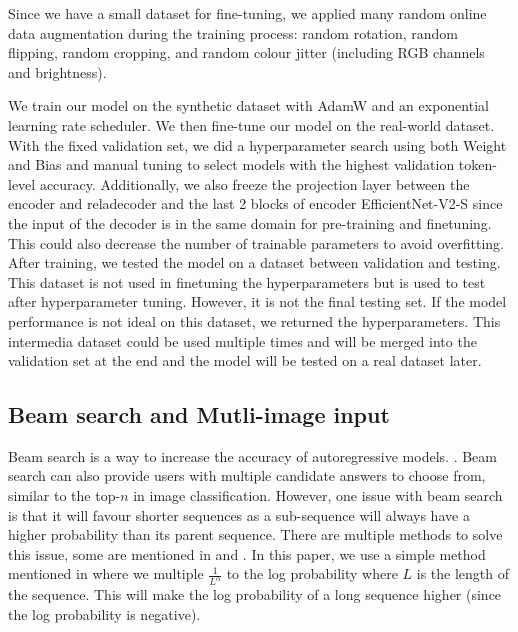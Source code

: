 \documentclass{article}
\begin{document}
Since we have a small dataset for fine-tuning, we applied many random online data augmentation during the training process: random rotation, random flipping, random cropping,  and random colour jitter (including RGB channels and brightness). 

We train our model on the synthetic dataset with AdamW \autocite{adamw} and an exponential learning rate scheduler. We then fine-tune our model on the real-world dataset. With the fixed validation set, we did a hyperparameter search using both Weight and Bias \autocite{wandb} and manual tuning to select models with the highest validation token-level accuracy.  
Additionally, we also freeze the projection layer between the encoder and reladecoder and the last 2 blocks of encoder EfficientNet-V2-S since the input of the decoder is in the same domain for pre-training and finetuning. This could also decrease the number of trainable parameters to avoid overfitting. 
After training, we tested the model on a dataset between validation and testing. This dataset is not used in finetuning the hyperparameters but is used to test after hyperparameter tuning. However, it is not the final testing set. If the model performance is not ideal on this dataset, we returned the hyperparameters. This intermedia dataset could be used multiple times and will be merged into the validation set at the end and the model will be tested on a real dataset later.

\subsection{Beam search and Mutli-image input}
Beam search is a way to increase the accuracy of autoregressive models. \autocite{yang_breaking_2018} \autocite{zhang_beam_2024}. Beam search can also provide users with multiple candidate answers to choose from, similar to the top-$n$ in image classification. However, one issue with beam search is that it will favour shorter sequences as a sub-sequence will always have a higher probability than its parent sequence. \autocite{yang_breaking_2018} \autocite{zhang_beam_2024} There are multiple methods to solve this issue, some are mentioned in \autocite{yang_breaking_2018} and \autocite{zhang_beam_2024}. In this paper, we use a simple method mentioned in \autocite{zhang_beam_2024} where we multiple  $\frac{1}{L^\alpha}$ to the log probability where $L$ is the length of the sequence. This will make the log probability of a long sequence higher (since the log probability is negative). 
\end{document}
